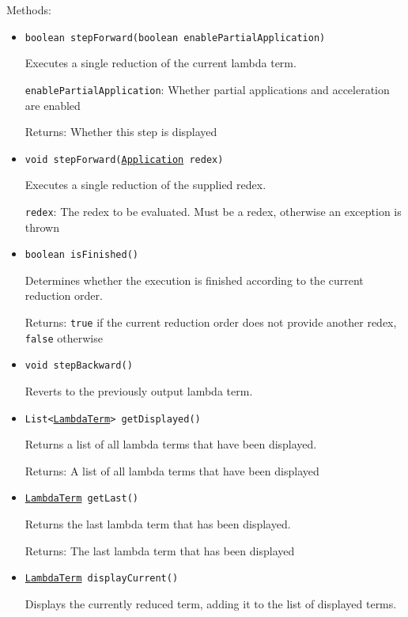 Methods:
\begin{itemize}
\item \texttt{boolean stepForward(boolean enablePartialApplication)}

Executes a single reduction of the current lambda term.

\texttt{enablePartialApplication}: Whether partial applications
 and acceleration are enabled

Returns: Whether this step is displayed

\item \texttt{void stepForward(\hyperref[type:edu.kit.wavelength.client.model.term.Application]{Application} redex)}

Executes a single reduction of the supplied redex.

\texttt{redex}: The redex to be evaluated. Must be a redex, otherwise an
 exception is thrown

\item \texttt{boolean isFinished()}

Determines whether the execution is finished according to the current reduction order.

Returns: \texttt{true} if the current reduction order does not provide another redex,
 \texttt{false} otherwise

\item \texttt{void stepBackward()}

Reverts to the previously output lambda term.

\item \texttt{List<\hyperref[type:edu.kit.wavelength.client.model.term.LambdaTerm]{LambdaTerm}> getDisplayed()}

Returns a list of all lambda terms that have been displayed.

Returns: A list of all lambda terms that have been displayed

\item \texttt{\hyperref[type:edu.kit.wavelength.client.model.term.LambdaTerm]{LambdaTerm} getLast()}

Returns the last lambda term that has been displayed.

Returns: The last lambda term that has been displayed

\item \texttt{\hyperref[type:edu.kit.wavelength.client.model.term.LambdaTerm]{LambdaTerm} displayCurrent()}

Displays the currently reduced term, adding it to the list of displayed terms.


\end{itemize}
